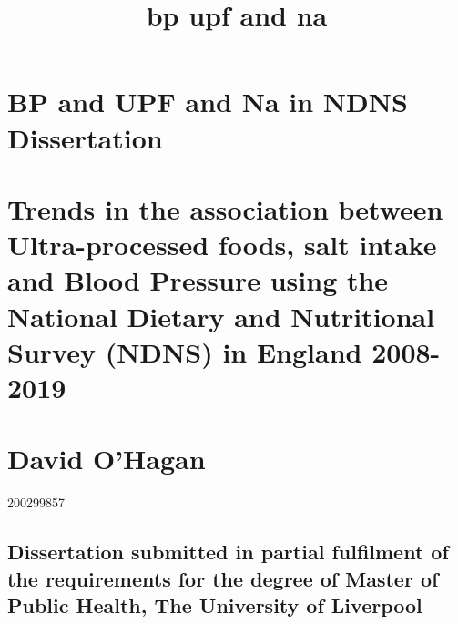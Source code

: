 \documentclass[
]{article}
\title{bp upf and na}
\author{}
\date{\vspace{-2.5em}}
\begin{document}
\maketitle

{
\setcounter{tocdepth}{2}
\tableofcontents
}
\hypertarget{bp-and-upf-and-na-in-ndns-dissertation}{%
\section*{BP and UPF and Na in NDNS
Dissertation}\label{bp-and-upf-and-na-in-ndns-dissertation}}

\hypertarget{trends-in-the-association-between-ultra-processed-foods-salt-intake-and-blood-pressure-using-the-national-dietary-and-nutritional-survey-ndns-in-england-2008-2019}{%
\section*{Trends in the association between Ultra-processed foods, salt
intake and Blood Pressure using the National Dietary and Nutritional
Survey (NDNS) in England
2008-2019}\label{trends-in-the-association-between-ultra-processed-foods-salt-intake-and-blood-pressure-using-the-national-dietary-and-nutritional-survey-ndns-in-england-2008-2019}}

\hypertarget{david-ohagan}{%
\section*{David O'Hagan}\label{david-ohagan}}

200299857

\hypertarget{dissertation-submitted-in-partial-fulfilment-of-the-requirements-for-the-degree-of-master-of-public-health-the-university-of-liverpool}{%
\subsection*{Dissertation submitted in partial fulfilment of the
requirements for the degree of Master of Public Health, The University
of
Liverpool}\label{dissertation-submitted-in-partial-fulfilment-of-the-requirements-for-the-degree-of-master-of-public-health-the-university-of-liverpool}}
\end{document}
